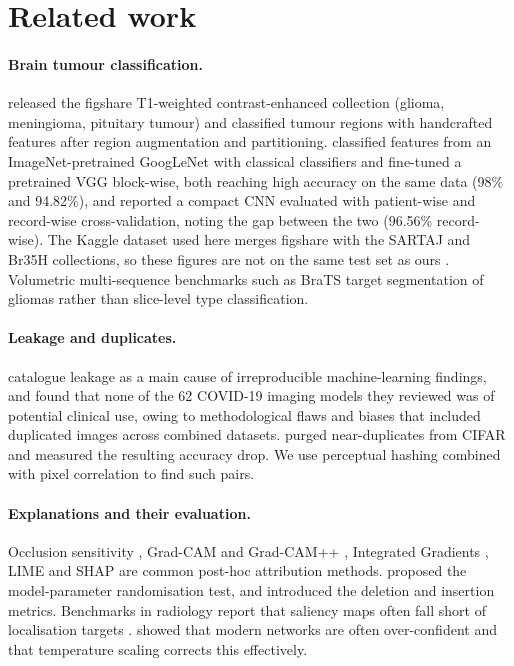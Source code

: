 \documentclass[11pt,a4paper]{article}
\begin{document}
\section{Related work}
\paragraph{Brain tumour classification.} \citet{cheng2015} released the figshare T1-weighted contrast-enhanced collection (glioma, meningioma, pituitary tumour) and classified tumour regions with handcrafted features after region augmentation and partitioning. \citet{deepak2019} classified features from an ImageNet-pretrained GoogLeNet \citep{deng2009} with classical classifiers and \citet{swati2019} fine-tuned a pretrained VGG block-wise, both reaching high accuracy on the same data (98\% and 94.82\%), and \citet{badza2020} reported a compact CNN evaluated with patient-wise and record-wise cross-validation, noting the gap between the two (96.56\% record-wise). The Kaggle dataset used here merges figshare with the SARTAJ and Br35H collections, so these figures are not on the same test set as ours \citep{nickparvar2021}. Volumetric multi-sequence benchmarks such as BraTS \citep{menze2015} target segmentation of gliomas rather than slice-level type classification.

\paragraph{Leakage and duplicates.} \citet{kapoor2023} catalogue leakage as a main cause of irreproducible machine-learning findings, and \citet{roberts2021} found that none of the 62 COVID-19 imaging models they reviewed was of potential clinical use, owing to methodological flaws and biases that included duplicated images across combined datasets. \citet{barz2020} purged near-duplicates from CIFAR and measured the resulting accuracy drop. We use perceptual hashing \citep{zauner2010} combined with pixel correlation to find such pairs.

\paragraph{Explanations and their evaluation.} Occlusion sensitivity \citep{zeiler2014}, Grad-CAM \citep{selvaraju2017} and Grad-CAM++ \citep{chattopadhay2018}, Integrated Gradients \citep{sundararajan2017}, LIME \citep{ribeiro2016} and SHAP \citep{lundberg2017} are common post-hoc attribution methods. \citet{adebayo2018} proposed the model-parameter randomisation test, and \citet{petsiuk2018} introduced the deletion and insertion metrics. Benchmarks in radiology report that saliency maps often fall short of localisation targets \citep{arun2021,saporta2022}. \citet{guo2017} showed that modern networks are often over-confident and that temperature scaling corrects this effectively.
\end{document}
